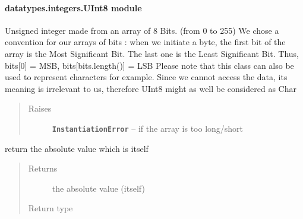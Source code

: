 \documentclass[letterpaper,10pt,english]{sphinxmanual}
\begin{document}
\paragraph{datatypes.integers.UInt8 module}
\label{datatypes.integers:datatypes-integers-uint8-module}\label{datatypes.integers:module-datatypes.integers.UInt8}

\begin{fulllineitems}
\label{datatypes.integers:datatypes.integers.UInt8.UInt8}
Unsigned integer made from an array of 8 Bits. (from 0 to 255)
We chose a convention for our arrays of bits :
when we initiate a byte, the first bit of the array is the Most Significant Bit.
The last one is the Least Significant Bit.
Thus, bits{[}0{]} = MSB, bits{[}bits.length(){]} = LSB
Please note that this class can also be used to represent characters for example.
Since we cannot access the data, its meaning is irrelevant to us, therefore UInt8 might as well be considered as Char
\begin{quote}\begin{description}
\item[{Raises}] \leavevmode
\textbf{\texttt{InstantiationError}} -- if the array is too long/short

\end{description}\end{quote}

\begin{fulllineitems}
\label{datatypes.integers:datatypes.integers.UInt8.UInt8.__abs__}
return the absolute value which is itself
\begin{quote}\begin{description}
\item[{Returns}] \leavevmode
the absolute value (itself)

\item[{Return type}] \leavevmode
{\hyperref[datatypes.integers:datatypes.integers.UInt8.UInt8]{}}

\end{description}\end{quote}

\end{fulllineitems}


\end{fulllineitems}
\end{document}
